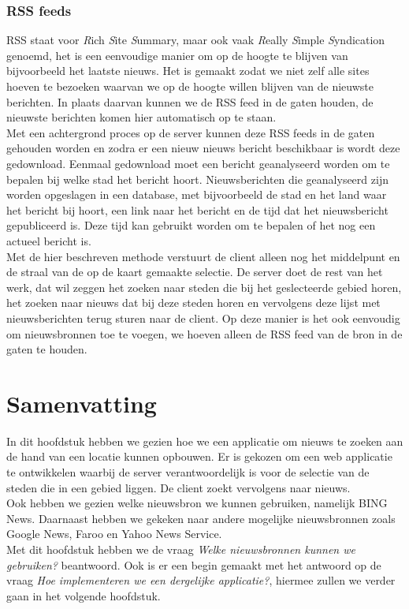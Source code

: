 \documentclass[twoside,openright]{uva-bachelor-thesis}
\begin{document}
		\subsubsection{RSS feeds}
			RSS staat voor \textit{R}ich \textit{S}ite \textit{S}ummary, maar ook vaak \textit{R}eally \textit{S}imple \textit{S}yndication genoemd, het is een eenvoudige manier om op de hoogte te blijven van bijvoorbeeld het laatste nieuws. Het is gemaakt zodat we niet zelf alle sites hoeven te bezoeken waarvan we op de hoogte willen blijven van de nieuwste berichten. In plaats daarvan kunnen we de RSS feed in de gaten houden, de nieuwste berichten komen hier automatisch op te staan.
			\\[0.5cm]
		Met een achtergrond proces op de server kunnen deze RSS feeds in de gaten gehouden worden en zodra er een nieuw nieuws bericht beschikbaar is wordt deze gedownload. Eenmaal gedownload moet een bericht geanalyseerd worden om te bepalen bij welke stad het bericht hoort. Nieuwsberichten die geanalyseerd zijn worden opgeslagen in een database, met bijvoorbeeld de stad en het land waar het bericht bij hoort, een link naar het bericht en de tijd dat het nieuwsbericht gepubliceerd is. Deze tijd kan gebruikt worden om te bepalen of het nog een actueel bericht is.
		\\[0.5cm]
		Met de hier beschreven methode verstuurt de client alleen nog het middelpunt en de straal van de op de kaart gemaakte selectie. De server doet de rest van het werk, dat wil zeggen het zoeken naar steden die bij het geslecteerde gebied horen, het zoeken naar nieuws dat bij deze steden horen en vervolgens deze lijst met nieuwsberichten terug sturen naar de client. Op deze manier is het ook eenvoudig om nieuwsbronnen toe te voegen, we hoeven alleen de RSS feed van de bron in de gaten te houden.
	\section{Samenvatting}
		In dit hoofdstuk hebben we gezien hoe we een applicatie om nieuws te zoeken aan de hand van een locatie kunnen opbouwen. Er is gekozen om een web applicatie te ontwikkelen waarbij de server verantwoordelijk is voor de selectie van de steden die in een gebied liggen. De client zoekt vervolgens naar nieuws. \\[0.5cm]
		Ook hebben we gezien welke nieuwsbron we kunnen gebruiken, namelijk BING News. Daarnaast hebben we gekeken naar andere mogelijke nieuwsbronnen zoals Google News, Faroo en Yahoo News Service.
		\\[0.5cm]
		Met dit hoofdstuk hebben we de vraag \textit{Welke nieuwsbronnen kunnen we gebruiken?} beantwoord. Ook is er een begin gemaakt met het antwoord op 
		de vraag \textit{Hoe implementeren we een dergelijke applicatie?}, hiermee zullen we verder gaan in het volgende hoofdstuk.
\end{document}
